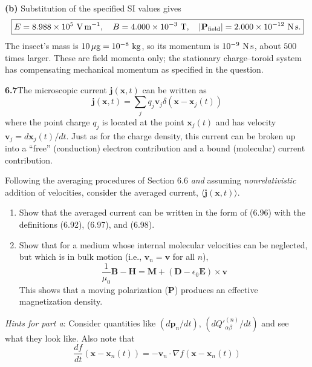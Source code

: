 \textbf{(b)} Substitution of the specified SI values gives
\[
\boxed{E=8.988\times10^5\ {\rm V\,m^{-1}},\quad
B=4.000\times10^{-3}\ {\rm T},\quad
|\mathbf P_{\rm field}|=2.000\times10^{-12}\ {\rm N\,s}.}
\]
The insect's mass is $10\,\mu{\rm g}=10^{-8}\ {\rm kg}$, so its momentum
is $10^{-9}\ {\rm N\,s}$, about $500$ times larger. These are field
momenta only; the stationary charge--toroid system has compensating
mechanical momentum as specified in the question.

\par\bigskip
\noindent\textbf{6.7}\quad The microscopic current $\mathbf{j}(\mathbf{x},t)$ can be written as
\[
\mathbf{j}(\mathbf{x},t)=\sum_{j}q_{j}\mathbf{v}_{j}\delta(\mathbf{x}-\mathbf{x}_{j}(t))
\]
where the point charge $q_{j}$ is located at the point $\mathbf{x}_{j}(t)$ and has velocity $\mathbf{v}_{j}=d\mathbf{x}_{j}(t)/dt$. Just as for the charge density, this current can be broken up into a ``free'' (conduction) electron contribution and a bound (molecular) current contribution.

Following the averaging procedures of Section 6.6 \emph{and} assuming \emph{nonrelativistic} addition of velocities, consider the averaged current, $\langle\mathbf{j}(\mathbf{x},t)\rangle$.
\begin{enumerate}
\item[(a)] Show that the averaged current can be written in the form of (6.96) with the definitions (6.92), (6.97), and (6.98).
\item[(b)] Show that for a medium whose internal molecular velocities can be neglected, but which is in bulk motion (i.e., $\mathbf{v}_{n}=\mathbf{v}$ for all $n$),
\[
\frac{1}{\mu_{0}}\mathbf{B}-\mathbf{H}=\mathbf{M}+(\mathbf{D}-\epsilon_{0}\mathbf{E})\times\mathbf{v}
\]
This shows that a moving polarization ($\mathbf{P}$) produces an effective magnetization density.
\end{enumerate}
\emph{Hints for part a}: Consider quantities like $(d\mathbf{p}_{n}/dt)$, $(dQ'^{(n)}_{\alpha\beta}/dt)$ and see what they look like. Also note that
\[
\frac{df}{dt}(\mathbf{x}-\mathbf{x}_{n}(t))=-\mathbf{v}_{n}\cdot\nabla f(\mathbf{x}-\mathbf{x}_{n}(t))
\]
\solution

